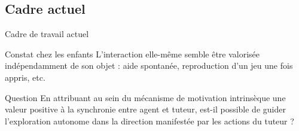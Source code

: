 \documentclass[xcolor=pst,dvips,12pt,english,french]{beamer}
\begin{document}
	\subsection{Cadre actuel}
	
	\begin{frame}{Cadre de travail actuel}
		\begin{block}{Constat chez les enfants}
			L'interaction elle-même semble être valorisée indépendamment de son objet : aide spontanée, reproduction d'un jeu une fois appris, etc.
		\end{block}
		\begin{exampleblock}{Question}
			En attribuant au sein du mécanisme de motivation intrinsèque une valeur positive à la synchronie entre agent et tuteur, est-il possible de guider l'exploration autonome dans la direction manifestée par les actions du tuteur ? 
		\end{exampleblock}
	\end{frame}
\end{document}
